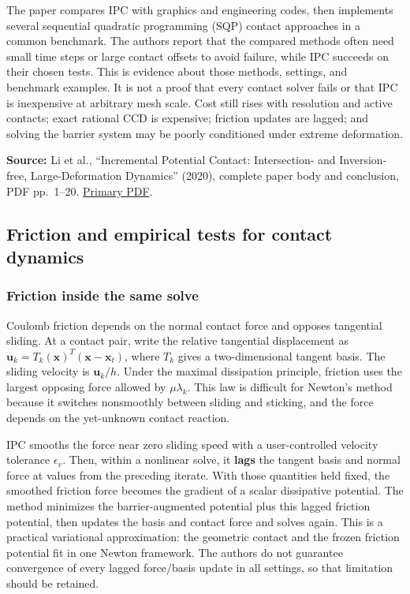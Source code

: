 The paper compares IPC with graphics and engineering codes, then implements several sequential quadratic programming (SQP) contact approaches in a common benchmark. The authors report that the compared methods often need small time steps or large contact offsets to avoid failure, while IPC succeeds on their chosen tests. This is evidence about those methods, settings, and benchmark examples. It is not a proof that every contact solver fails or that IPC is inexpensive at arbitrary mesh scale. Cost still rises with resolution and active contacts; exact rational CCD is expensive; friction updates are lagged; and solving the barrier system may be poorly conditioned under extreme deformation.

\textbf{Source:} Li et al., ``Incremental Potential Contact: Intersection- and Inversion-free, Large-Deformation Dynamics'' (2020), complete paper body and conclusion, PDF pp.~1--20. \href{https://ipc-sim.github.io/file/IPC-paper-350ppi.pdf}{Primary PDF}.

\subsection{Friction and empirical tests for contact dynamics}\label{04-visual-computing-ii-ch029-friction-and-empirical-tests-for-contact-dynamics}

\hypertarget{04-visual-computing-ii-ch029-friction-and-empirical-tests-for-contact-dynamics}{}

\subsubsection{Friction inside the same solve}\label{04-visual-computing-ii-ch029-friction-inside-the-same-solve-1}

\hypertarget{04-visual-computing-ii-ch029-friction-inside-the-same-solve-1}{}

Coulomb friction depends on the normal contact force and opposes tangential sliding. At a contact pair, write the relative tangential displacement as \(\mathbf{u}_k=T_k(\mathbf{x})^T(\mathbf{x}-\mathbf{x}_t)\), where \(T_k\) gives a two-dimensional tangent basis. The sliding velocity is \(\mathbf{u}_k/h\). Under the maximal dissipation principle, friction uses the largest opposing force allowed by \(\mu\lambda_k\). This law is difficult for Newton's method because it switches nonsmoothly between sliding and sticking, and the force depends on the yet-unknown contact reaction.

IPC smooths the force near zero sliding speed with a user-controlled velocity tolerance \(\epsilon_v\). Then, within a nonlinear solve, it \textbf{lags} the tangent basis and normal force at values from the preceding iterate. With those quantities held fixed, the smoothed friction force becomes the gradient of a scalar dissipative potential. The method minimizes the barrier-augmented potential plus this lagged friction potential, then updates the basis and contact force and solves again. This is a practical variational approximation: the geometric contact and the frozen friction potential fit in one Newton framework. The authors do not guarantee convergence of every lagged force/basis update in all settings, so that limitation should be retained.

